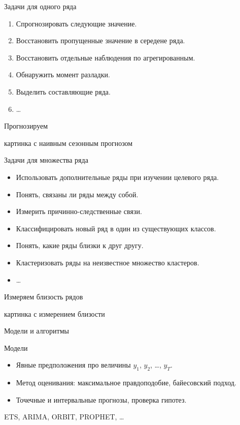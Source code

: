 \begin{frame}{Задачи для одного ряда}

\begin{enumerate}[<+->]
  \item Спрогнозировать следующие значение.
  \item Восстановить пропущенные значение в середене ряда.
  \item Восстановить отдельные наблюдения по агрегированным.
  \item Обнаружить момент разладки.
  \item Выделить составляющие ряда. 
  \item \ldots 
\end{enumerate}

\end{frame}


\begin{frame}{Прогнозируем}

  картинка с наивным сезонным прогнозом

\end{frame}


\begin{frame}{Задачи для множества ряда}

  \begin{itemize}[<+->]
    \item Использовать дополнительные ряды при изучении целевого ряда.
    \item Понять, связаны ли ряды между собой.
    \item Измерить причинно-следственные связи.
    \item Классифицировать новый ряд в один из существующих классов.
    \item Понять, какие ряды близки к друг другу.
    \item Кластеризовать ряды на неизвестное множество кластеров.
    \item \ldots
  \end{itemize}
  
\end{frame}
  
\begin{frame}{Измеряем близость рядов}

  картинка с измерением близости

\end{frame}



\begin{frame}{Модели и алгоритмы}

\begin{block}{Модели}
\begin{itemize}[<+->]
  \item Явные предположения про величины $y_1$, $y_2$, \ldots, $y_T$.
  \item Метод оценивания: максимальное правдоподобие, байесовский подход.
  \item Точечные и интервальные прогнозы, проверка гипотез. 
\end{itemize}
\end{block}

\pause
ETS, ARIMA, ORBIT, PROPHET, \ldots

\end{frame}

